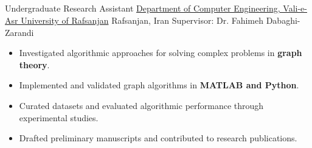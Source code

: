 \documentclass[10pt,a4paper,sans]{moderncv}        %
\newcommand{\ExternalLink}{%
	\tikz[x=1.2ex, y=1.2ex, baseline=-0.05ex]{%
		\begin{scope}[x=1ex, y=1ex]
			\clip (-0.1,-0.1)
			--++ (-0, 1.2)
			--++ (0.6, 0)
			--++ (0, -0.6)
			--++ (0.6, 0)
			--++ (0, -1);
			\path[draw,
			line width = 0.5,
			rounded corners=0.5]
			(0,0) rectangle (1,1);
		\end{scope}
		\path[draw, line width = 0.5] (0.5, 0.5)
		-- (1, 1);
		\path[draw, line width = 0.5] (0.6, 1)
		-- (1, 1) -- (1, 0.6);
	}
}
\begin{document}
\vspace*{-3mm}
\subsection{}

  {Undergraduate Research Assistant}
  {\href{https://benymaxparsa.github.io/research/Vru-RA}{Department of Computer Engineering, Vali-e-Asr University of Rafsanjan}}
  {Rafsanjan, Iran}
  {Supervisor: Dr. Fahimeh Dabaghi-Zarandi}
  {\begin{itemize}%
    \item Investigated algorithmic approaches for solving complex problems in \textbf{graph theory}.
    \item Implemented and validated graph algorithms in \textbf{MATLAB and Python}.
    \item Curated datasets and evaluated algorithmic performance through experimental studies.
    \item Drafted preliminary manuscripts and contributed to research publications.
  \end{itemize}}
%	
%
%
%
%		
%		
\end{document}
